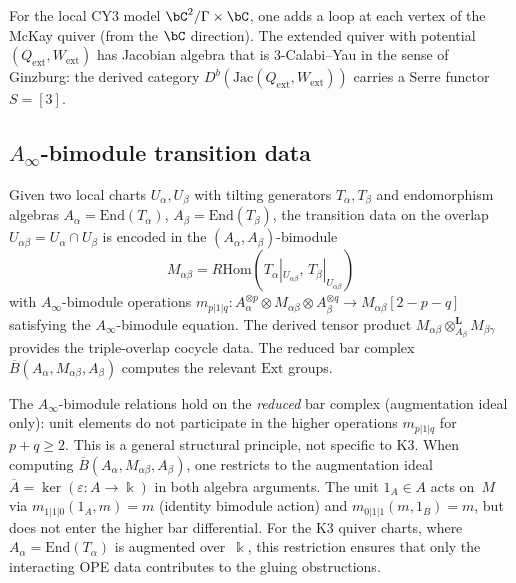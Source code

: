 \begin{remark}[CY3 extension]
\label{rem:cy3-extension}
For the local CY3 model $\bC^2/\Gamma \times \bC$, one adds a
loop at each vertex of the McKay quiver (from the $\bC$
direction). The extended quiver with potential $(Q_{\mathrm{ext}},
W_{\mathrm{ext}})$ has Jacobian algebra that is $3$-Calabi--Yau
in the sense of Ginzburg: the derived category
$D^b(\mathrm{Jac}(Q_{\mathrm{ext}}, W_{\mathrm{ext}}))$
carries a Serre functor $S = [3]$.
\end{remark}

\subsection{$A_\infty$-bimodule transition data}
\label{subsec:ainfty-bimodule}

\begin{construction}
\label{constr:ainfty-bimodule}
Given two local charts $U_\alpha, U_\beta$ with tilting
generators $T_\alpha, T_\beta$ and endomorphism algebras
$A_\alpha = \mathrm{End}(T_\alpha)$,
$A_\beta = \mathrm{End}(T_\beta)$, the transition data on the
overlap $U_{\alpha\beta} = U_\alpha \cap U_\beta$ is encoded
in the $(A_\alpha, A_\beta)$-bimodule
\[
M_{\alpha\beta} = R\mathrm{Hom}(T_\alpha|_{U_{\alpha\beta}},\,
T_\beta|_{U_{\alpha\beta}})
\]
with $A_\infty$-bimodule operations
$m_{p|1|q}\colon A_\alpha^{\otimes p} \otimes M_{\alpha\beta}
\otimes A_\beta^{\otimes q} \to M_{\alpha\beta}[2-p-q]$
satisfying the $A_\infty$-bimodule equation. The derived tensor
product $M_{\alpha\beta} \otimes^{\mathbf{L}}_{A_\beta}
M_{\beta\gamma}$ provides the triple-overlap cocycle data.
The reduced bar complex $\overline{B}(A_\alpha, M_{\alpha\beta},
A_\beta)$ computes the relevant $\mathrm{Ext}$ groups.
\end{construction}

\begin{remark}
\label{rem:reduced-bar-bimodule}
The $A_\infty$-bimodule relations hold on the \emph{reduced}
bar complex (augmentation ideal only): unit elements do not
participate in the higher operations $m_{p|1|q}$ for $p + q \geq 2$.
This is a general structural principle, not specific to K3.
When computing $\overline{B}(A_\alpha, M_{\alpha\beta}, A_\beta)$,
one restricts to the augmentation ideal
$\overline{A} = \ker(\varepsilon \colon A \to \Bbbk)$
in both algebra arguments. The unit $1_A \in A$ acts on~$M$
via $m_{1|1|0}(1_A, m) = m$ (identity bimodule action) and
$m_{0|1|1}(m, 1_B) = m$, but does not enter the higher bar
differential. For the K3 quiver charts, where
$A_\alpha = \mathrm{End}(T_\alpha)$ is augmented over~$\Bbbk$,
this restriction ensures that only the interacting OPE data
contributes to the gluing obstructions.
\end{remark}


